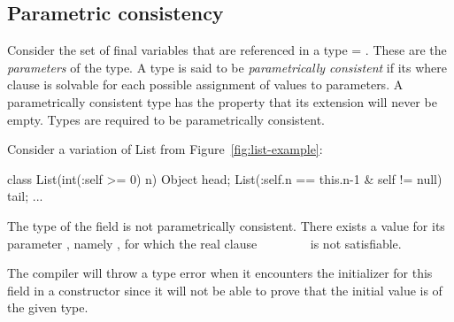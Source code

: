 \subsection{Parametric consistency}

Consider the set of final variables that are referenced in a
type  = . These are the {\em parameters} of
the type. A type is said to be {\em parametrically consistent}
if its where clause  is solvable for each possible assignment of
values to parameters.  A parametrically consistent type has the
property that its extension will never be empty. 
Types are required to be parametrically consistent.

Consider  a variation of List from Figure~\ref{fig:list-example}:
\begin{displayxten}
class List(int(:self >= 0) n) {
  Object head;
  List(:self.n == this.n-1 & self != null) tail;
  ...
}
\end{displayxten}
The type of the field  is not parametrically
consistent. There exists a value for its parameter , namely
, for which the real clause ~\xcd{!=}~ \xcd{&}
~\xcd{==}~ \xcd{&}
~\xcd{>=}~ is not satisfiable.

The compiler will throw a type error when it encounters the
initializer for this field in a constructor since it will not be able
to prove that the initial value is of the given type.


